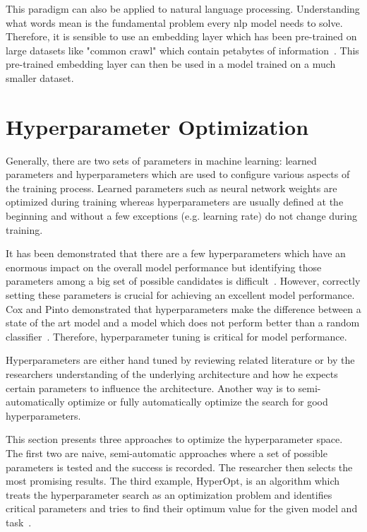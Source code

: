 This paradigm can also be applied to natural language processing. Understanding what words mean is the fundamental problem every \gls{nlp} model needs to solve. Therefore, it is sensible to use an embedding layer which has been pre-trained on large datasets like "common crawl" which contain petabytes of information~\cite{commonCrawl}. This pre-trained embedding layer can then be used in a model trained on a much smaller dataset.
 
\section{Hyperparameter Optimization}

Generally, there are two sets of parameters in machine learning: learned parameters and hyperparameters which are used to configure various aspects of the training process. Learned parameters such as neural network weights are optimized during training whereas hyperparameters are usually defined at the beginning and without a few exceptions {(e.g. learning rate)} do not change during training.

It has been demonstrated that there are a few hyperparameters which have an enormous impact on the overall model performance but identifying those parameters among a big set of possible candidates is difficult~\cite{Bergstra2012a}. However, correctly setting these parameters is crucial for achieving an excellent model performance. Cox and Pinto demonstrated that hyperparameters make the difference between a state of the art model and a model which does not perform better than a random classifier~\cite{Cox2011}. Therefore, hyperparameter tuning is critical for model performance.

Hyperparameters are either hand tuned by reviewing related literature or by the researchers understanding of the underlying architecture and how he expects certain parameters to influence the architecture. Another way is to semi-automatically optimize or fully automatically optimize the search for good hyperparameters.

This section presents three approaches to optimize the hyperparameter space. The first two are naive, semi-automatic approaches where a set of possible parameters is tested and the success is recorded. The researcher then selects the most promising results. The third example, HyperOpt, is an algorithm which treats the hyperparameter search as an optimization problem and identifies critical parameters and tries to find their optimum value for the given model and task~\cite{Bergstra2013}.




